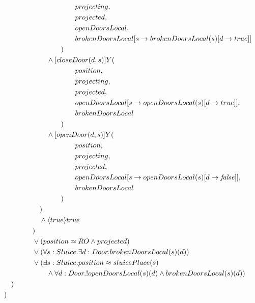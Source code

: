 \begin{description}
\begin{align*}
& \tab\tab\tab\tab\tab\tab\tab\tab\tab\tab\tab projecting, \\
& \tab\tab\tab\tab\tab\tab\tab\tab\tab\tab\tab projected, \\
& \tab\tab\tab\tab\tab\tab\tab\tab\tab\tab\tab openDoorsLocal, \\
& \tab\tab\tab\tab\tab\tab\tab\tab\tab\tab\tab brokenDoorsLocal[s \to brokenDoorsLocal(s)[d \to true]] \\
& \tab\tab\tab\tab\tab\tab\tab\tab\tab ) \\
& \tab\tab\tab\tab\tab\tab\tab  \wedge [closeDoor(d, s)]Y( \\
& \tab\tab\tab\tab\tab\tab\tab\tab\tab\tab\tab position, \\
& \tab\tab\tab\tab\tab\tab\tab\tab\tab\tab\tab projecting, \\
& \tab\tab\tab\tab\tab\tab\tab\tab\tab\tab\tab projected, \\
& \tab\tab\tab\tab\tab\tab\tab\tab\tab\tab\tab openDoorsLocal[s \to openDoorsLocal(s)[d \to true]], \\
& \tab\tab\tab\tab\tab\tab\tab\tab\tab\tab\tab brokenDoorsLocal \\
& \tab\tab\tab\tab\tab\tab\tab\tab\tab ) \\
& \tab\tab\tab\tab\tab\tab\tab \wedge [openDoor(d, s)]Y( \\
& \tab\tab\tab\tab\tab\tab\tab\tab\tab\tab\tab position, \\
& \tab\tab\tab\tab\tab\tab\tab\tab\tab\tab\tab projecting, \\
& \tab\tab\tab\tab\tab\tab\tab\tab\tab\tab\tab projected, \\
& \tab\tab\tab\tab\tab\tab\tab\tab\tab\tab\tab openDoorsLocal[s \to openDoorsLocal(s)[d \to \mathit{false}]], \\
& \tab\tab\tab\tab\tab\tab\tab\tab\tab\tab\tab brokenDoorsLocal \\
& \tab\tab\tab\tab\tab\tab\tab\tab\tab ) \\
& \tab\tab\tab\tab\tab\tab ) \\
& \tab\tab\tab\tab\tab\tab \wedge \langle true \rangle true \\
& \tab\tab\tab\tab\tab ) \\
& \tab\tab\tab\tab\tab \vee (position \approx RO \wedge projected) \\
& \tab\tab\tab\tab\tab \vee (\forall s: Sluice . \exists d: Door . brokenDoorsLocal(s)(d)) \\
& \tab\tab\tab\tab\tab \vee (\exists s: Sluice . position \approx sluicePlace(s) \\
& \tab\tab\tab\tab\tab\tab\tab \wedge \forall d: Door . !openDoorsLocal(s)(d) \wedge brokenDoorsLocal(s)(d)) \\
& \tab\tab ) \\
& \tab ) \\
\end{align*}


\end{description}
